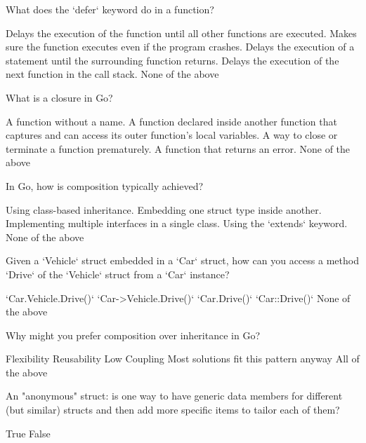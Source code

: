 \documentclass[12pt]{exam}
\begin{document}
\begin{questions}
\question[2]  What does the `defer` keyword do in a function?
\begin{choices}
\choice  Delays the execution of the function until all other functions are executed.
\choice  Makes sure the function executes even if the program crashes.
\CorrectChoice  Delays the execution of a statement until the surrounding function returns.
\choice  Delays the execution of the next function in the call stack.
\choice  None of the above
\end{choices}
 
\question[2]  What is a closure in Go?
\begin{choices}
\choice  A function without a name.
\CorrectChoice  A function declared inside another function that captures and can access its outer function's local variables.
\choice  A way to close or terminate a function prematurely.
\choice  A function that returns an error.
\choice  None of the above
\end{choices}
 
\question[2]  In Go, how is composition typically achieved?
\begin{choices}
\choice  Using class-based inheritance.
\CorrectChoice  Embedding one struct type inside another.
\choice  Implementing multiple interfaces in a single class.
\choice  Using the `extends` keyword.
\choice  None of the above
\end{choices}
 
\question[2]  Given a `Vehicle` struct embedded in a `Car` struct, how can you access a method `Drive` of the `Vehicle` struct from a `Car` instance?
\begin{choices}
\choice  `Car.Vehicle.Drive()`
\choice  `Car->Vehicle.Drive()`
\CorrectChoice  `Car.Drive()`
\choice  `Car::Drive()`
\choice  None of the above
\end{choices}
 
\question[2]  Why might you prefer composition over inheritance in Go?
\begin{choices}
\choice  Flexibility
\choice  Reusability
\choice  Low Coupling
\choice  Most solutions fit this pattern anyway
\CorrectChoice  All of the above
\end{choices}
 
\question[2]  An "anonymous" struct: is one way to have generic data members for different (but similar) structs and then add more specific items to tailor each of them?
\begin{choices}
\CorrectChoice  True
\choice  False
\end{choices}
 

\end{questions}
\end{document}

